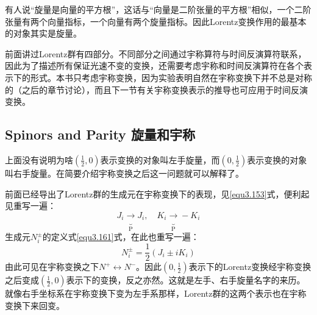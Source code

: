 有人说“旋量是向量的平方根”，这话与“向量是二阶张量的平方根”相似，一个二阶张量有两个向量指标，一个向量有两个旋量指标。因此Lorentz变换作用的最基本的对象其实是旋量。

前面讲过Lorentz群有四部分。不同部分之间通过宇称算符与时间反演算符联系，因此为了描述所有保证光速不变的变换，还需要考虑宇称和时间反演算符在各个表示下的形式。本书只考虑宇称变换，因为实验表明自然在宇称变换下并不总是对称的（之后的章节讨论），而且下一节有关宇称变换表示的推导也可应用于时间反演变换。

\subsection[旋量和宇称]{Spinors and Parity \quad 旋量和宇称}
\label{sec3.7.9}
上面没有说明为啥$(\frac{1}{2}, 0)$表示变换的对象叫左手旋量，而$(0, \frac{1}{2})$表示变换的对象叫右手旋量。在简要介绍宇称变换之后这一问题就可以解释了。

前面已经导出了Lorentz群的生成元在宇称变换下的表现，见\eqref{equ3.153}式，便利起见重写一遍：
\begin{equation}
\label{equ3.222}
    J_i \underbrace{\rightarrow}_{\mathrm{P}} J_i, \quad K_i \underbrace{\rightarrow}_{\mathrm{P}} -K_i
\end{equation}
生成元$N_i^\pm$的定义式\eqref{equ3.161}式，在此也重写一遍：
\begin{equation}
\label{equ3.223}
    N_i^\pm = \frac{1}{2} (J_i \pm iK_i)
\end{equation}
由此可见在宇称变换之下$N^+ \leftrightarrow N^-$。因此$(0, \frac{1}{2})$表示下的Lorentz变换经宇称变换之后变成$(\frac{1}{2}, 0)$表示下的变换，反之亦然。这就是左手、右手旋量名字的来历。就像右手坐标系在宇称变换下变为左手系那样，Lorentz群的这两个表示也在宇称变换下来回变。

